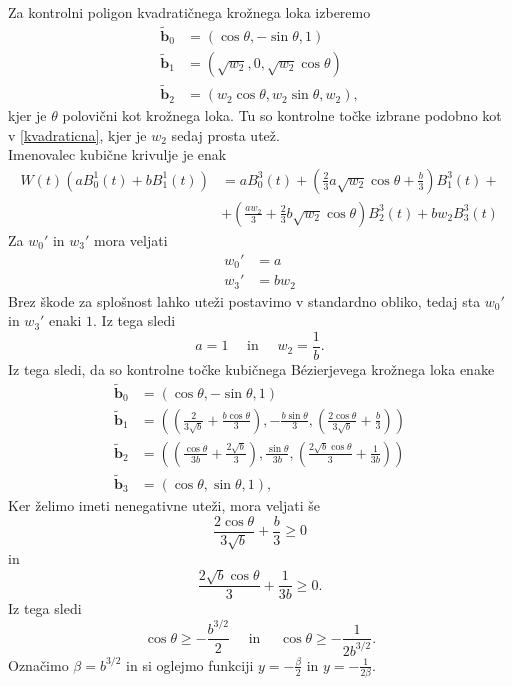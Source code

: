 \documentclass[a4paper,11pt]{article}
\theoremstyle{definition}
\theoremstyle{plain}
\begin{document}
\noindent
Za kontrolni poligon kvadratičnega krožnega loka izberemo
\begin{align*}
\boldsymbol{\tilde{b}}_0 &= (\cos{\theta}, -\sin{\theta}, 1)\\
\boldsymbol{\tilde{b}}_1 &= (\sqrt{w_2}, 0,\sqrt{w_2} \cos{\theta})\\
\boldsymbol{\tilde{b}}_2 &= (w_2\cos \theta, w_2 \sin\theta, w_2),
\end{align*}
kjer je $\theta$ polovični kot krožnega loka. Tu so kontrolne točke izbrane podobno kot v \ref{kvadraticna}, kjer je $w_2$ sedaj prosta utež.
\\
Imenovalec kubične krivulje je enak
\begin{align*}
W(t)(aB_0^1(t)+bB_1^1(t)) &= aB_0^3(t)+\left ( \frac{2}{3}a\sqrt{w_2}\cos \theta +\frac{b}{3} \right )B_1^3(t)+ \\
&+ \left ( \frac{aw_2}{3} + \frac{2}{3}b\sqrt{w_2}\cos \theta  \right )B_2^3(t) + bw_2B_3^3(t)
\end{align*}
Za $w_0'$ in $w_3'$ mora veljati
\begin{align*}
w_0'&=a \\
w_3'&=bw_2
\end{align*}
Brez škode za splošnost lahko uteži postavimo v standardno obliko, tedaj sta $w_0'$ in $w_3'$ enaki $1$. Iz tega sledi
$$ a=1 \quad \text{ in } \quad w_2=\frac{1}{b}.$$
Iz tega sledi, da so kontrolne točke kubičnega B\'ezierjevega krožnega loka enake
\begin{align*}
\boldsymbol{\tilde{b}}_0 &= (\cos{\theta}, -\sin{\theta}, 1)\\
\boldsymbol{\tilde{b}}_1 &= \left ( \left (\frac{2}{3\sqrt{b}}+\frac{b\cos \theta}{3}\right ),-\frac{b \sin \theta}{3},\left (\frac{2\cos \theta}{3\sqrt{b}}+\frac{b}{3}\right )\right )\\
\boldsymbol{\tilde{b}}_2 &= \left ( \left (\frac{\cos \theta}{3b}+\frac{2\sqrt{b}}{3}\right ),\frac{\sin \theta}{3b},\left (\frac{2\sqrt{b}\cos \theta}{3}+\frac{1}{3b}\right )\right )\\
\boldsymbol{\tilde{b}}_3 &= (\cos \theta, \sin\theta, 1),
\end{align*}
Ker želimo imeti nenegativne uteži, mora veljati še
$$\frac{2\cos \theta}{3\sqrt{b}}+\frac{b}{3}\geq0$$
in
$$\frac{2\sqrt{b}\cos \theta}{3}+\frac{1}{3b}\geq0.$$
Iz tega sledi
$$\cos \theta \geq -\frac{b^{3/2}}{2}\quad\text{ in }\quad \cos  \theta \geq -\frac{1}{2b^{3/2}}.$$
Označimo $\beta=b^{3/2}$ in si oglejmo funkciji $y=-\frac{\beta}{2}$ in $y=-\frac{1}{2\beta}$.\\
\end{document}
